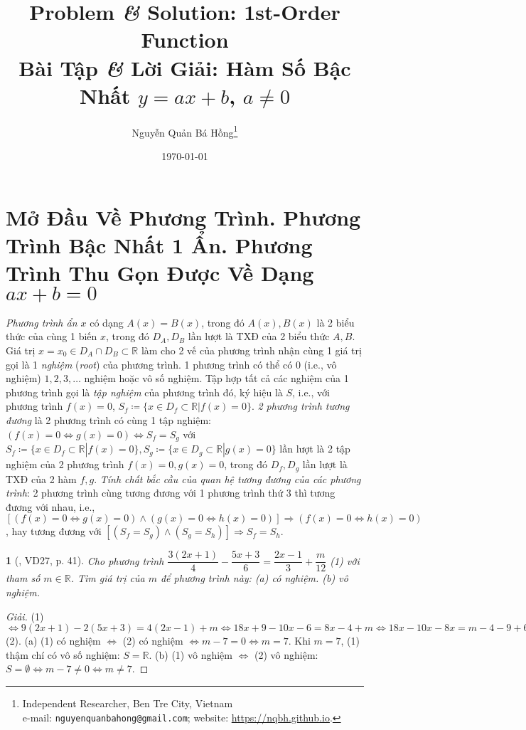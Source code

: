 \documentclass{article}
\title{Problem {\it\&} Solution: 1st-Order Function\\Bài Tập {\it\&} Lời Giải: Hàm Số Bậc Nhất $y = ax + b$, $a\ne0$}
\author{Nguyễn Quản Bá Hồng\footnote{Independent Researcher, Ben Tre City, Vietnam\\e-mail: \texttt{nguyenquanbahong@gmail.com}; website: \url{https://nqbh.github.io}.}}
\date{\today}
\newtheorem{baitoan}{}
\begin{document}
\maketitle
\tableofcontents


\section{Mở Đầu Về Phương Trình. Phương Trình Bậc Nhất 1 Ẩn. Phương Trình Thu Gọn Được Về Dạng $ax + b = 0$}
 \textit{Phương trình ẩn $x$} có dạng $A(x) = B(x)$, trong đó $A(x),B(x)$ là 2 biểu thức của cùng 1 biến $x$, trong đó $D_A,D_B$ lần lượt là TXĐ của 2 biểu thức $A,B$. Giá trị $x = x_0\in D_A\cap D_B\subset\mathbb{R}$ làm cho 2 vế của phương trình nhận cùng 1 giá trị gọi là 1 \textit{nghiệm} (\textit{root}) của phương trình. 1 phương trình có thể có 0 (i.e., vô nghiệm) $1,2,3,\ldots$ nghiệm hoặc vô số nghiệm. Tập hợp tất cả các nghiệm của 1 phương trình gọi là \textit{tập nghiệm} của phương trình đó, ký hiệu là $S$, i.e., với phương trình $f(x) = 0$, $S_f\coloneqq\{x\in D_f\subset\mathbb{R}|f(x) = 0\}$.  \textit{2 phương trình tương đương} là 2 phương trình có cùng 1 tập nghiệm: $(f(x) = 0\Leftrightarrow g(x) = 0)\Leftrightarrow S_f = S_g$ với $S_f\coloneqq\{x\in D_f\subset\mathbb{R}|f(x) = 0\},S_g\coloneqq\{x\in D_g\subset\mathbb{R}|g(x) = 0\}$ lần lượt là 2 tập nghiệm của 2 phương trình $f(x) = 0,g(x) = 0$, trong đó $D_f,D_g$ lần lượt là TXĐ của 2 hàm $f,g$. \textit{Tính chất bắc cầu của quan hệ tương đương của các phương trình}: 2 phương trình cùng tương đương với 1 phương trình thứ 3 thì tương đương với nhau, i.e., $[(f(x) = 0\Leftrightarrow g(x) = 0)\land(g(x) = 0\Leftrightarrow h(x) = 0)]\Rightarrow(f(x) = 0\Leftrightarrow h(x) = 0)$, hay tương đương với $[(S_f = S_g)\land(S_g = S_h)]\Rightarrow S_f = S_h$.

\begin{baitoan}[\cite{Tuyen_Toan_8}, VD27, p. 41]
	Cho phương trình $\dfrac{3(2x + 1)}{4} - \dfrac{5x + 3}{6} = \dfrac{2x - 1}{3} + \dfrac{m}{12}$ {\rm(1)} với tham số $m\in\mathbb{R}$. Tìm giá trị của $m$ để phương trình này: (a) có nghiệm. (b) vô nghiệm.
\end{baitoan}

\begin{proof}[Giải]
	(1) $\Leftrightarrow9(2x + 1) - 2(5x + 3) = 4(2x - 1) + m\Leftrightarrow18x + 9 - 10x - 6 = 8x - 4 + m\Leftrightarrow18x - 10x - 8x = m - 4 - 9 + 6\Leftrightarrow0x = m - 7$ (2). (a) (1) có nghiệm $\Leftrightarrow$ (2) có nghiệm $\Leftrightarrow m - 7 = 0\Leftrightarrow m = 7$. Khi $m = 7$, (1) thậm chí có vô số nghiệm: $S = \mathbb{R}$. (b) (1) vô nghiệm $\Leftrightarrow$ (2) vô nghiệm: $S = \emptyset\Leftrightarrow m - 7\ne0\Leftrightarrow m\ne7$.
\end{proof}
\end{document}
